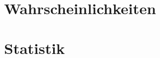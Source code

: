 \documentclass{article}
\begin{document}
\begin{multicols*}{3}
    \raggedright
    \part{Wahrscheinlichkeiten}
    
    
    
    
    \clearpage
    \part{Statistik}
    
    
    \clearpage
\end{multicols*}
\end{document}
